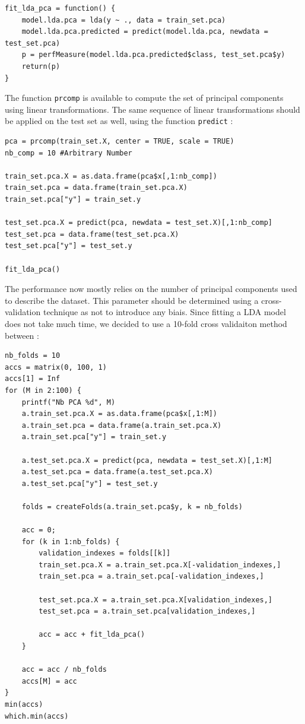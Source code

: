 \documentclass[]{report}
\begin{document}
\begin{lstlisting}
fit_lda_pca = function() {
	model.lda.pca = lda(y ~ ., data = train_set.pca)
	model.lda.pca.predicted = predict(model.lda.pca, newdata = test_set.pca)
	p = perfMeasure(model.lda.pca.predicted$class, test_set.pca$y)
	return(p)
}

\end{lstlisting}

The function \texttt{prcomp} is available to compute the set of principal components using linear transformations. The same sequence of linear transformations should be applied on the test set as well, using the function \texttt{predict} : 
\begin{lstlisting}
pca = prcomp(train_set.X, center = TRUE, scale = TRUE)
nb_comp = 10 #Arbitrary Number

train_set.pca.X = as.data.frame(pca$x[,1:nb_comp])
train_set.pca = data.frame(train_set.pca.X)
train_set.pca["y"] = train_set.y

test_set.pca.X = predict(pca, newdata = test_set.X)[,1:nb_comp]
test_set.pca = data.frame(test_set.pca.X)
test_set.pca["y"] = test_set.y

fit_lda_pca()
\end{lstlisting}

The performance now mostly relies on the number of principal components used to describe the dataset. This parameter should be determined using a cross-validation technique as not to introduce any biais. Since fitting a LDA model does not take much time, we decided to use a 10-fold cross validaiton method between : 

\begin{lstlisting}
nb_folds = 10
accs = matrix(0, 100, 1)
accs[1] = Inf
for (M in 2:100) {
	printf("Nb PCA %d", M)
	a.train_set.pca.X = as.data.frame(pca$x[,1:M])
	a.train_set.pca = data.frame(a.train_set.pca.X)
	a.train_set.pca["y"] = train_set.y
	
	a.test_set.pca.X = predict(pca, newdata = test_set.X)[,1:M]
	a.test_set.pca = data.frame(a.test_set.pca.X)
	a.test_set.pca["y"] = test_set.y
	
	folds = createFolds(a.train_set.pca$y, k = nb_folds)
	
	acc = 0;
	for (k in 1:nb_folds) {
		validation_indexes = folds[[k]]
		train_set.pca.X = a.train_set.pca.X[-validation_indexes,]
		train_set.pca = a.train_set.pca[-validation_indexes,]
		
		test_set.pca.X = a.train_set.pca.X[validation_indexes,]
		test_set.pca = a.train_set.pca[validation_indexes,]
		
		acc = acc + fit_lda_pca()
	}
	
	acc = acc / nb_folds
	accs[M] = acc
}
min(accs)
which.min(accs)
\end{lstlisting}
\end{document}
